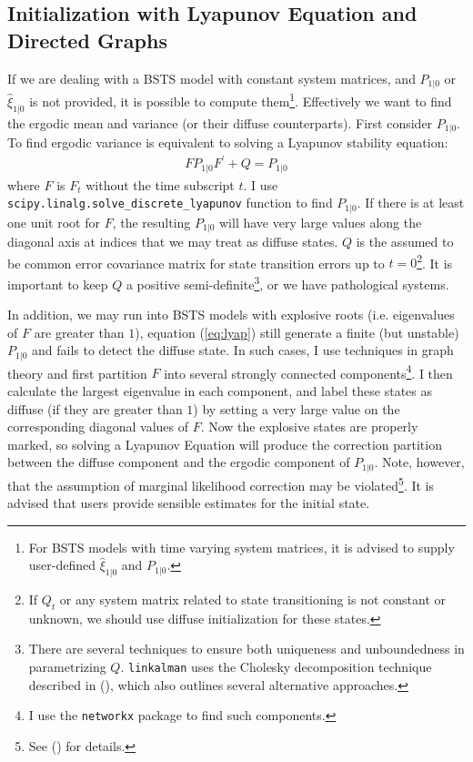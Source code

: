\documentclass[10pt, titlepage]{article}
\numberwithin{equation}{section}
\begin{document}
\subsection{Initialization with Lyapunov Equation and Directed Graphs} 
If we are dealing with a BSTS model with constant system matrices, and $P_{1|0}$ or $\hat{\xi}_{1|0}$ is not provided, it is possible to compute them\footnote{For BSTS models with time varying system matrices, it is advised to supply user-defined $\hat{\xi}_{1|0}$ and $P_{1|0}$.}. Effectively we want to find the ergodic mean and variance (or their diffuse counterparts). First consider $P_{1|0}$. To find ergodic variance is equivalent to solving a Lyapunov stability equation:
\begin{align}
    FP_{1|0}F^{'} + Q = P_{1|0} \label{eq:lyap}
\end{align}
where $F$ is $F_t$ without the time subscript $t$. I use \texttt{scipy.linalg.solve\_discrete\_lyapunov} function to find $P_{1|0}$. If there is at least one unit root for $F$, the resulting $P_{1|0}$ will have very large values along the diagonal axis at indices that we may treat as diffuse states. $Q$ is the assumed to be common error covariance matrix for state transition errors up to $t=0$\footnote{If $Q_t$ or any system matrix related to state transitioning is not constant or unknown, we should use diffuse initialization for these states.}. It is important to keep $Q$ a positive semi-definite\footnote{There are several techniques to ensure both uniqueness and unboundedness in parametrizing $Q$. \texttt{linkalman} uses the Cholesky decomposition technique described in (\cite{pinheiro1996unconstrained}), which also outlines several alternative approaches.}, or we have pathological systems. 

In addition, we may run into BSTS models with explosive roots (i.e. eigenvalues of $F$ are greater than $1$), equation (\ref{eq:lyap}) still generate a finite (but unstable) $P_{1|0}$ and fails to detect the diffuse state. In such cases, I use techniques in graph theory and first partition $F$ into several strongly connected components\footnote{I use the \texttt{networkx} package to find such components.}. I then calculate the largest eigenvalue in each component, and label these states as diffuse (if they are greater than $1$) by setting a very large value on the corresponding diagonal values of $F$. Now the explosive states are properly marked, so solving a Lyapunov Equation will produce the correction partition between the diffuse component and the ergodic component of $P_{1|0}$. Note, however, that the assumption of marginal likelihood correction may be violated\footnote{See (\cite{francke_etal_2010}) for details.}. It is advised that users provide sensible estimates for the initial state.
\end{document}
